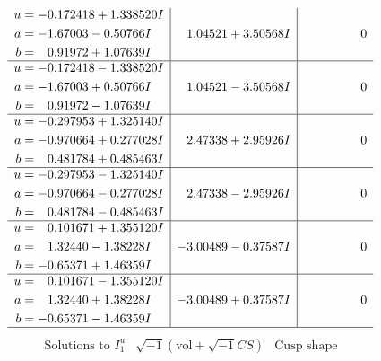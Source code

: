 \documentclass[1p]{elsarticle_modified}
\theoremstyle{definition}
\newcommand{\I}{\sqrt{-1}}
\begin{document}
$$\begin{array}{c|c|c}
\begin{aligned}
u &= -0.172418 + 1.338520 I \\
a &= -1.67003 - 0.50766 I \\
b &= \phantom{-}0.91972 + 1.07639 I\end{aligned}
 & \phantom{-}1.04521 + 3.50568 I & \phantom{-0.000000 } 0 \\ \hline\begin{aligned}
u &= -0.172418 - 1.338520 I \\
a &= -1.67003 + 0.50766 I \\
b &= \phantom{-}0.91972 - 1.07639 I\end{aligned}
 & \phantom{-}1.04521 - 3.50568 I & \phantom{-0.000000 } 0 \\ \hline\begin{aligned}
u &= -0.297953 + 1.325140 I \\
a &= -0.970664 + 0.277028 I \\
b &= \phantom{-}0.481784 + 0.485463 I\end{aligned}
 & \phantom{-}2.47338 + 2.95926 I & \phantom{-0.000000 } 0 \\ \hline\begin{aligned}
u &= -0.297953 - 1.325140 I \\
a &= -0.970664 - 0.277028 I \\
b &= \phantom{-}0.481784 - 0.485463 I\end{aligned}
 & \phantom{-}2.47338 - 2.95926 I & \phantom{-0.000000 } 0 \\ \hline\begin{aligned}
u &= \phantom{-}0.101671 + 1.355120 I \\
a &= \phantom{-}1.32440 - 1.38228 I \\
b &= -0.65371 + 1.46359 I\end{aligned}
 & -3.00489 - 0.37587 I & \phantom{-0.000000 } 0 \\ \hline\begin{aligned}
u &= \phantom{-}0.101671 - 1.355120 I \\
a &= \phantom{-}1.32440 + 1.38228 I \\
b &= -0.65371 - 1.46359 I\end{aligned}
 & -3.00489 + 0.37587 I & \phantom{-0.000000 } 0\\
 \hline 
 \end{array}$$\newpage$$\begin{array}{c|c|c}  
\text{Solutions to }I^u_{1}& \I (\text{vol} + \sqrt{-1}CS) & \text{Cusp shape}\\
 \hline 
\begin{aligned}

\end{aligned}
\end{array}$$
\end{document}
